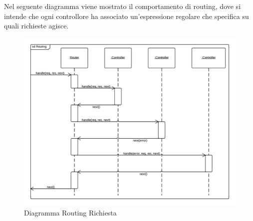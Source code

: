 Nel seguente diagramma viene mostrato il comportamento di routing, dove si intende che ogni controllore ha associato un'espressione regolare che specifica su quali richieste agisce. 
\begin{figure}[H]
	\begin{center} 
		\includegraphics[scale=0.27]{scenari/Diagramma Routing Richiesta.png} 
		\caption{Diagramma Routing Richiesta}
	\end{center} 
\end{figure}

\pagebreak
